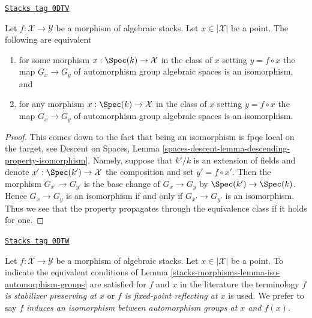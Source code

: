 \begin{lemma}
\label{stacks-morphisms-lemma-iso-automorphism-groups}
\href{https://stacks.math.columbia.edu/tag/0DTV}{\texttt{Stacks tag 0DTV}}

Let $f : \mathcal{X} \to \mathcal{Y}$ be a morphism of algebraic stacks.
Let $x \in |\mathcal{X}|$ be a point. The following are equivalent
\begin{enumerate}
\item for some morphism $x : \Spec(k) \to \mathcal{X}$ in the
class of $x$ setting $y = f \circ x$ the map
$G_x \to G_y$ of automorphism group algebraic spaces
is an isomorphism, and
\item for any morphism $x : \Spec(k) \to \mathcal{X}$ in the
class of $x$ setting $y = f \circ x$ the map
$G_x \to G_y$ of automorphism group algebraic spaces
is an isomorphism.
\end{enumerate}
\end{lemma}

\begin{proof}
This comes down to the fact that being an isomorphism
is fpqc local on the target, see
Descent on Spaces, Lemma
\ref{spaces-descent-lemma-descending-property-isomorphism}.
Namely, suppose that $k'/k$ is an extension of fields and
denote $x' : \Spec(k') \to \mathcal{X}$ the composition
and set $y' = f \circ x'$.
Then the morphism $G_{x'} \to G_{y'}$ is the base change
of $G_x \to G_y$ by $\Spec(k') \to \Spec(k)$.
Hence $G_x \to G_y$ is an isomorphism
if and only if $G_{x'} \to G_{y'}$ is an isomorphism.
Thus we see that the property propagates through the
equivalence class if it holds for one.
\end{proof}

\begin{remark}
\label{stacks-morphisms-remark-identify-automorphism-groups}
\href{https://stacks.math.columbia.edu/tag/0DTW}{\texttt{Stacks tag 0DTW}}

Let $f : \mathcal{X} \to \mathcal{Y}$ be a morphism of algebraic stacks.
Let $x \in |\mathcal{X}|$ be a point. To indicate the equivalent
conditions of Lemma \ref{stacks-morphisms-lemma-iso-automorphism-groups}
are satisfied for $f$ and $x$ in the literature the terminology
{\it $f$ is stabilizer preserving at $x$} or
{\it $f$ is fixed-point reflecting at $x$} is used.
We prefer to say {\it $f$ induces an isomorphism between
automorphism groups at $x$ and $f(x)$}.
\end{remark}

